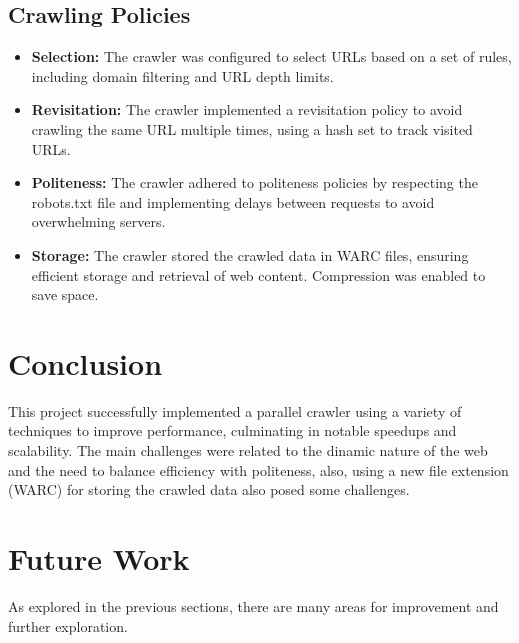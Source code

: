 \subsection{Crawling Policies}

\begin{itemize}
  \item \textbf{Selection:} The crawler was configured to select URLs based on a set of rules, including domain filtering and URL depth limits.
  \item \textbf{Revisitation:} The crawler implemented a revisitation policy to avoid crawling the same URL multiple times, using a hash set to track visited URLs.
  \item \textbf{Politeness:} The crawler adhered to politeness policies by respecting the robots.txt file and implementing delays between requests to avoid overwhelming servers.
  \item \textbf{Storage:} The crawler stored the crawled data in WARC files, ensuring efficient storage and retrieval of web content. Compression was enabled to save space.
\end{itemize}

\section{Conclusion}

This project successfully implemented a parallel crawler using a variety of techniques to improve performance, culminating in notable speedups and scalability. The main challenges were related to the dinamic nature of the web and the need to balance efficiency with politeness, also, using a new file extension (WARC) for storing the crawled data also posed some challenges.

\section{Future Work}

As explored in the previous sections, there are many areas for improvement and further exploration.




